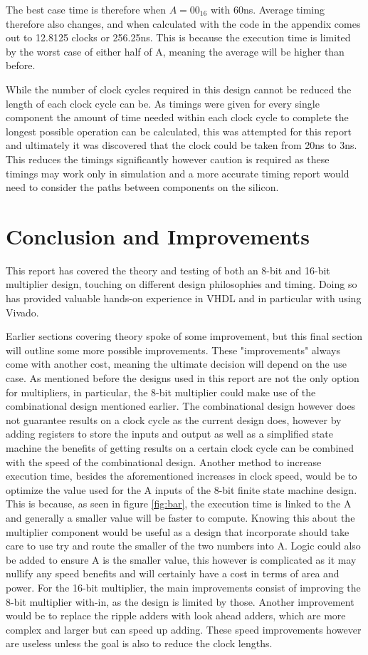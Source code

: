 \documentclass[11pt]{article}
\begin{document}
The best case time is therefore when $A=00_{16}$ with 60ns.
Average timing therefore also changes, and when calculated with the code in the appendix comes out to 12.8125 clocks or 256.25ns.
This is because the execution time is limited by the worst case of either half of A, meaning the average will be higher than before.

While the number of clock cycles required in this design cannot be reduced the length of each clock cycle can be.
As timings were given for every single component the amount of time needed within each clock cycle to complete the longest possible operation can be calculated,
this was attempted for this report and ultimately it was discovered that the clock could be taken from 20ns to 3ns.
This reduces the timings significantly however caution is required as these timings may work only in simulation and a more accurate timing report would need to consider the paths between components on the silicon.

\section{Conclusion and Improvements}
This report has covered the theory and testing of both an 8-bit and 16-bit multiplier design,
touching on different design philosophies and timing. 
Doing so has provided valuable hands-on experience in VHDL and in particular with using Vivado.

Earlier sections covering theory spoke of some improvement, but this final section will outline some more possible improvements.
These "improvements" always come with another cost, meaning the ultimate decision will depend on the use case.
As mentioned before the designs used in this report are not the only option for multipliers, in particular, the 8-bit multiplier could make use of the combinational design mentioned earlier.
The combinational design however does not guarantee results on a clock cycle as the current design does,
however by adding registers to store the inputs and output as well as a simplified state machine the benefits of getting results on a certain clock cycle can be combined with the speed of the combinational design.
Another method to increase execution time, besides the aforementioned increases in clock speed, would be to optimize the value used for the A inputs of the 8-bit finite state machine design.
This is because, as seen in figure \ref{fig:bar}, the execution time is linked to the A and generally a smaller value will be faster to compute. 
Knowing this about the multiplier component would be useful as a design that incorporate should take care to use try and route the smaller of the two numbers into A.
Logic could also be added to ensure A is the smaller value, this however is complicated as it may nullify any speed benefits and will certainly have a cost in terms of area and power. 
For the 16-bit multiplier, the main improvements consist of improving the 8-bit multiplier with-in, as the design is limited by those.
Another improvement would be to replace the ripple adders with look ahead adders, which are more complex and larger but can speed up adding.
These speed improvements however are useless unless the goal is also to reduce the clock lengths.
\end{document}
